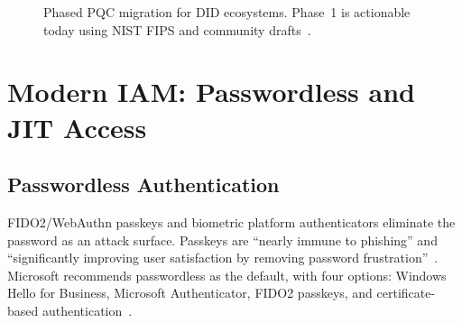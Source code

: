 \documentclass[sigconf,nonacm]{acmart}
\begin{document}
\begin{figure}[h]
\centering
{}
\caption{Phased PQC migration for DID ecosystems.
  Phase~1 is actionable today using NIST FIPS and community
  drafts~\cite{nist204,linkedin2024}.}
\label{fig:phases}
\end{figure}

\section{Modern IAM: Passwordless and JIT Access}

\subsection{Passwordless Authentication}

FIDO2/WebAuthn passkeys and biometric platform authenticators
eliminate the password as an attack surface.  Passkeys are ``nearly
immune to phishing'' and ``significantly improving user satisfaction
by removing password frustration''~\cite{ping2024pass}.  Microsoft
recommends passwordless as the default, with four options: Windows
Hello for Business, Microsoft Authenticator, FIDO2 passkeys, and
certificate-based authentication~\cite{msft2024}.
\end{document}
